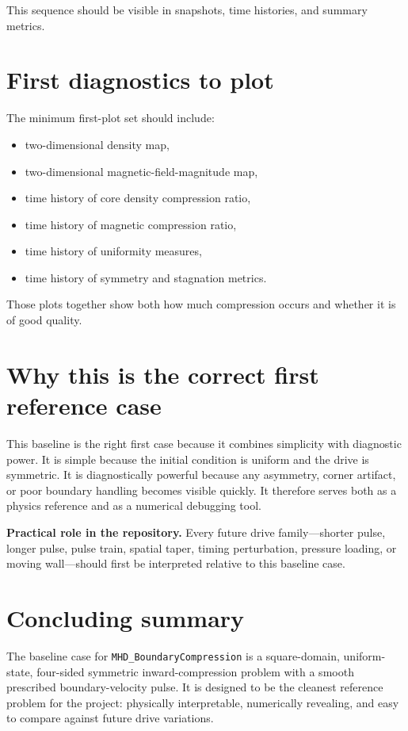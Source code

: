 \documentclass[11pt]{article}
\begin{document}
This sequence should be visible in snapshots, time histories, and summary metrics.

\section{First diagnostics to plot}
The minimum first-plot set should include:
\begin{itemize}
    \item two-dimensional density map,
    \item two-dimensional magnetic-field-magnitude map,
    \item time history of core density compression ratio,
    \item time history of magnetic compression ratio,
    \item time history of uniformity measures,
    \item time history of symmetry and stagnation metrics.
\end{itemize}

Those plots together show both how much compression occurs and whether it is of good quality.

\section{Why this is the correct first reference case}
This baseline is the right first case because it combines simplicity with diagnostic power. It is simple because the initial condition is uniform and the drive is symmetric. It is diagnostically powerful because any asymmetry, corner artifact, or poor boundary handling becomes visible quickly. It therefore serves both as a physics reference and as a numerical debugging tool.

\begin{keybox}
\textbf{Practical role in the repository.} Every future drive family---shorter pulse, longer pulse, pulse train, spatial taper, timing perturbation, pressure loading, or moving wall---should first be interpreted relative to this baseline case.
\end{keybox}

\section{Concluding summary}
The baseline case for \texttt{MHD\_BoundaryCompression} is a square-domain, uniform-state, four-sided symmetric inward-compression problem with a smooth prescribed boundary-velocity pulse. It is designed to be the cleanest reference problem for the project: physically interpretable, numerically revealing, and easy to compare against future drive variations.
\end{document}
